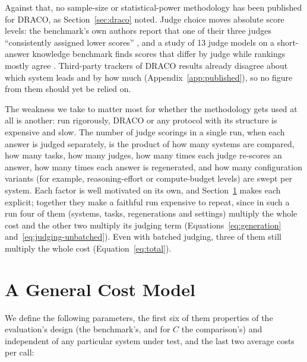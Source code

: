 \documentclass[11pt]{article}
\newcommand{\sectionbreak}{\par\ifdim\pagetotal<5.5\baselineskip\relax\else\clearpage\fi}
\begin{document}
Against that, no sample-size or statistical-power methodology has been published for DRACO, as Section~\ref{sec:draco} noted. Judge choice moves absolute score levels: the benchmark's own authors report that one of their three judges ``consistently assigned lower scores'' \citep[Appendix~A]{draco2026}, and a study of 13 judge models on a short-answer knowledge benchmark finds scores that differ by judge while rankings mostly agree \citep{thakur2025judging}. Third-party trackers of DRACO results already disagree about which system leads and by how much (Appendix~\ref{app:published}), so no figure from them should yet be relied on.

The weakness we take to matter most for whether the methodology gets used at all is another: run rigorously, DRACO or any protocol with its structure is expensive and slow. The number of judge scorings in a single run, when each answer is judged separately, is the product of how many systems are compared, how many tasks, how many judges, how many times each judge re-scores an answer, how many times each answer is regenerated, and how many configuration variants (for example, reasoning-effort or compute-budget levels) are swept per system. Each factor is well motivated on its own, and Section~\ref{sec:model} makes each explicit; together they make a faithful run expensive to repeat, since in such a run four of them (systems, tasks, regenerations and settings) multiply the whole cost and the other two multiply its judging term (Equations~\ref{eq:generation} and~\ref{eq:judging-unbatched}). Even with batched judging, three of them still multiply the whole cost (Equation~\ref{eq:total}).

\sectionbreak
\section{A General Cost Model}
\label{sec:model}

We define the following parameters, the first six of them properties of the evaluation's design (the benchmark's, and for $C$ the comparison's) and independent of any particular system under test, and the last two average costs per call:
\end{document}
